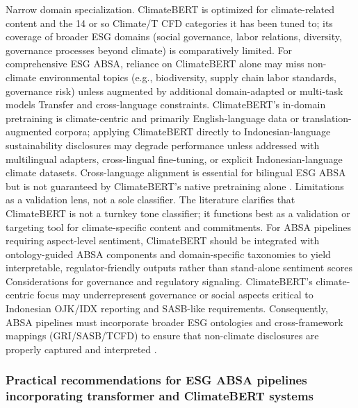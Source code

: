 Narrow domain specialization. ClimateBERT is optimized for climate-related content and the 14 or so Climate/T CFD categories it has been tuned to; its coverage of broader ESG domains (social governance, labor relations, diversity, governance processes beyond climate) is comparatively limited. For comprehensive ESG ABSA, reliance on ClimateBERT alone may miss non-climate environmental topics (e.g., biodiversity, supply chain labor standards, governance risk) unless augmented by additional domain-adapted or multi-task models \cite{10.3390/su15053919,10.1371/journal.pone.0288052,10.48550/arxiv.2511.00024}
Transfer and cross-language constraints. ClimateBERT’s in-domain pretraining is climate-centric and primarily English-language data or translation-augmented corpora; applying ClimateBERT directly to Indonesian-language sustainability disclosures may degrade performance unless addressed with multilingual adapters, cross-lingual fine-tuning, or explicit Indonesian-language climate datasets. Cross-language alignment is essential for bilingual ESG ABSA but is not guaranteed by ClimateBERT’s native pretraining alone \cite{10.1016/j.inffus.2025.103073,10.1111/eufm.12509,10.48550/arxiv.2511.00024}.
Limitations as a validation lens, not a sole classifier. The literature clarifies that ClimateBERT is not a turnkey tone classifier; it functions best as a validation or targeting tool for climate-specific content and commitments. For ABSA pipelines requiring aspect-level sentiment, ClimateBERT should be integrated with ontology-guided ABSA components and domain-specific taxonomies to yield interpretable, regulator-friendly outputs rather than stand-alone sentiment scores \cite{10.18653/v1/2023.emnlp-main.975,10.1371/journal.pone.0288052}
Considerations for governance and regulatory signaling. ClimateBERT’s climate-centric focus may underrepresent governance or social aspects critical to Indonesian OJK/IDX reporting and SASB-like requirements. Consequently, ABSA pipelines must incorporate broader ESG ontologies and cross-framework mappings (GRI/SASB/TCFD) to ensure that non-climate disclosures are properly captured and interpreted \cite{10.1177/09726225241237304,10.1111/ejed.70225,10.1145/3503044}.
\subsubsection{Practical recommendations for ESG ABSA pipelines incorporating transformer and ClimateBERT systems}

